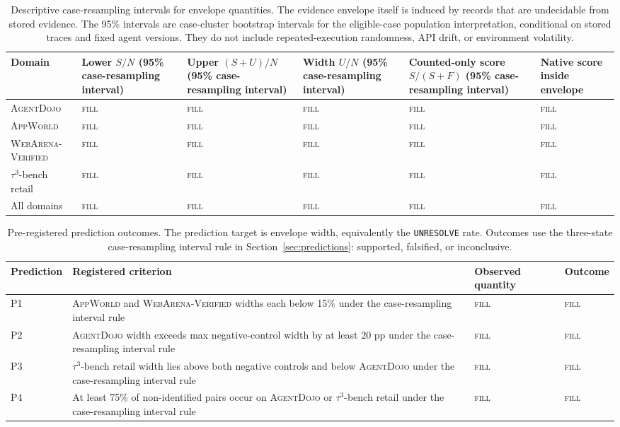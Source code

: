 \documentclass{article}
\newcommand{\agentdojo}{\textsc{AgentDojo}\xspace}
\newcommand{\appworld}{\textsc{AppWorld}\xspace}
\newcommand{\webarena}{\textsc{WebArena-Verified}\xspace}
\newcommand{\tauthree}{\(\tau^3\)-bench retail\xspace}
\newcommand{\fillfromdata}{\textsc{fill}}
\providecommand{\ADJLowerCI}{\fillfromdata}
\providecommand{\ADJUpperCI}{\fillfromdata}
\providecommand{\ADJWidthCI}{\fillfromdata}
\providecommand{\ADJCountedScoreCI}{\fillfromdata}
\providecommand{\ADJNativeInside}{\fillfromdata}
\providecommand{\APPLowerCI}{\fillfromdata}
\providecommand{\APPUpperCI}{\fillfromdata}
\providecommand{\APPWidthCI}{\fillfromdata}
\providecommand{\APPCountedScoreCI}{\fillfromdata}
\providecommand{\APPNativeInside}{\fillfromdata}
\providecommand{\WAVLowerCI}{\fillfromdata}
\providecommand{\WAVUpperCI}{\fillfromdata}
\providecommand{\WAVWidthCI}{\fillfromdata}
\providecommand{\WAVCountedScoreCI}{\fillfromdata}
\providecommand{\WAVNativeInside}{\fillfromdata}
\providecommand{\TAULowerCI}{\fillfromdata}
\providecommand{\TAUUpperCI}{\fillfromdata}
\providecommand{\TAUWidthCI}{\fillfromdata}
\providecommand{\TAUCountedScoreCI}{\fillfromdata}
\providecommand{\TAUNativeInside}{\fillfromdata}
\providecommand{\ALLLowerCI}{\fillfromdata}
\providecommand{\ALLUpperCI}{\fillfromdata}
\providecommand{\ALLWidthCI}{\fillfromdata}
\providecommand{\ALLCountedScoreCI}{\fillfromdata}
\providecommand{\ALLNativeInside}{\fillfromdata}
\providecommand{\PoneValue}{\fillfromdata}
\providecommand{\PoneOutcome}{\fillfromdata}
\providecommand{\PtwoValue}{\fillfromdata}
\providecommand{\PtwoOutcome}{\fillfromdata}
\providecommand{\PthreeValue}{\fillfromdata}
\providecommand{\PthreeOutcome}{\fillfromdata}
\providecommand{\PfourValue}{\fillfromdata}
\providecommand{\PfourOutcome}{\fillfromdata}
\begin{document}
\begin{table}[t]
\centering
\caption{Descriptive case-resampling intervals for envelope quantities. The
evidence envelope itself is induced by records that are undecidable from stored
evidence. The 95\% intervals are case-cluster bootstrap intervals for the
eligible-case population interpretation, conditional on stored traces and fixed
agent versions. They do not include repeated-execution randomness, API drift,
or environment volatility.}
\label{tab:main-results-B}
\footnotesize
\setlength{\tabcolsep}{3pt}
\renewcommand{\arraystretch}{1.14}
\begin{tabularx}{\textwidth}{@{}l X X X X X@{}}
\toprule
Domain & Lower \(S/N\) (95\% case-resampling interval) & Upper \((S+U)/N\) (95\% case-resampling interval) & Width \(U/N\) (95\% case-resampling interval) & Counted-only score \(S/(S+F)\) (95\% case-resampling interval) & Native score inside envelope \\
\midrule
\agentdojo & \ADJLowerCI & \ADJUpperCI & \ADJWidthCI & \ADJCountedScoreCI & \ADJNativeInside \\
\appworld & \APPLowerCI & \APPUpperCI & \APPWidthCI & \APPCountedScoreCI & \APPNativeInside \\
\webarena & \WAVLowerCI & \WAVUpperCI & \WAVWidthCI & \WAVCountedScoreCI & \WAVNativeInside \\
\tauthree & \TAULowerCI & \TAUUpperCI & \TAUWidthCI & \TAUCountedScoreCI & \TAUNativeInside \\
\midrule
All domains & \ALLLowerCI & \ALLUpperCI & \ALLWidthCI & \ALLCountedScoreCI & \ALLNativeInside \\
\bottomrule
\end{tabularx}
\end{table}

\begin{table}[t]
\centering
\caption{Pre-registered prediction outcomes. The prediction target is envelope
width, equivalently the \texttt{UNRESOLVE} rate. Outcomes use the three-state
case-resampling interval rule in Section~\ref{sec:predictions}: supported,
falsified, or inconclusive.}
\label{tab:prediction-outcomes}
\footnotesize
\setlength{\tabcolsep}{3pt}
\renewcommand{\arraystretch}{1.14}
\begin{tabularx}{\linewidth}{@{}l X X X@{}}
\toprule
Prediction & Registered criterion & Observed quantity & Outcome \\
\midrule
P1 & \appworld and \webarena widths each below 15\% under the case-resampling interval rule & \PoneValue & \PoneOutcome \\
P2 & \agentdojo width exceeds max negative-control width by at least 20 pp under the case-resampling interval rule & \PtwoValue & \PtwoOutcome \\
P3 & \tauthree width lies above both negative controls and below \agentdojo under the case-resampling interval rule & \PthreeValue & \PthreeOutcome \\
P4 & At least 75\% of non-identified pairs occur on \agentdojo or \tauthree under the case-resampling interval rule & \PfourValue & \PfourOutcome \\
\bottomrule
\end{tabularx}
\end{table}
\end{document}
